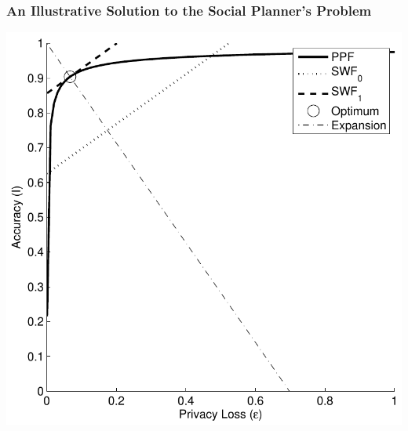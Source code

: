\begin{frame}[allowframebreaks]%
\frametitle{An Illustrative Solution to the Social Planner's Problem}

\begin{center}
	\includegraphics[scale=.5]{plannersprob_income}
\end{center}


\end{frame}%
%

